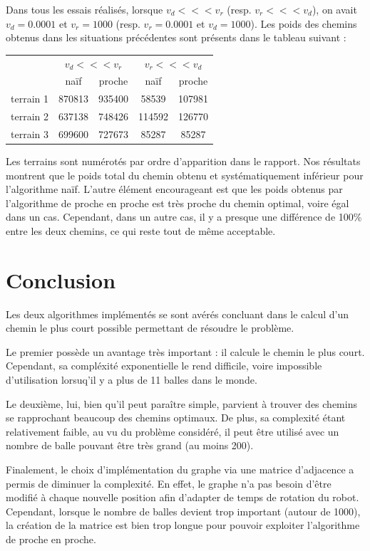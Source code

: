 \documentclass[12pt]{article}
\begin{document}
    Dans tous les essais réalisés, lorsque $v_d <<< v_r$ (resp. $v_r <<< v_d$), on avait $v_d = 0.0001$ et $v_r = 1000$ (resp. $v_r = 0.0001$ et $v_d = 1000$). Les poids des chemins obtenus dans les situations précédentes sont présents dans le tableau suivant :
    
    \medskip
    
    \begin{center}
    \begin{tabular}{c|c|c|c|c|}
      \cline{2-5}
      & \multicolumn{2}{c|}{$v_d <<< v_r$} & \multicolumn{2}{c|}{$v_r <<< v_d$} \\
      \cline{2-5}
      & naïf & proche & naïf & proche \\
      \hline
      terrain 1 & 870813 & 935400 & 58539 & 107981 \\
      \hline
      terrain 2 & 637138 & 748426 & 114592 & 126770 \\
      \hline
      terrain 3 & 699600 & 727673 & 85287 & 85287 \\
   \end{tabular}
  \end{center}

   Les terrains sont numérotés par ordre d'apparition dans le rapport. Nos résultats montrent que le poids total du chemin obtenu et systématiquement inférieur pour l'algorithme naïf. L'autre élément encourageant est que les poids obtenus par l'algorithme de proche en proche est très proche du chemin optimal, voire égal dans un cas. Cependant, dans un autre cas, il y a presque une différence de 100\% entre les deux chemins, ce qui reste tout de même acceptable.

   \section{Conclusion}
   \label{sec:ccl}

   Les deux algorithmes implémentés se sont avérés concluant dans le calcul d'un chemin le plus court possible permettant de résoudre le problème.
   
   Le premier possède un avantage très important : il calcule le chemin le plus court. Cependant, sa compléxité exponentielle le rend difficile, voire impossible d'utilisation lorsuq'il y a plus de 11 balles dans le monde.
   
   Le deuxième, lui, bien qu'il peut paraître simple, parvient à trouver des chemins se rapprochant beaucoup des chemins optimaux. De plus, sa complexité étant relativement faible, au vu du problème considéré, il peut être utilisé avec un nombre de balle pouvant être très grand (au moins 200).

   Finalement, le choix d'implémentation du graphe via une matrice d'adjacence a permis de diminuer la complexité. En effet, le graphe n'a pas besoin d'être modifié à chaque nouvelle position afin d'adapter de temps de rotation du robot. Cependant, lorsque le nombre de balles devient trop important (autour de 1000), la création de la matrice est bien trop longue pour pouvoir exploiter l'algorithme de proche en proche.
\end{document}

